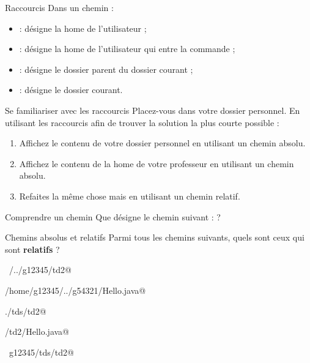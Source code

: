 \documentclass[a4paper,11pt]{style-esi/td}
\begin{document}
		\begin{theorie}{Raccourcis}
			Dans un chemin :
			\begin{itemize}
			\item {} : désigne la home de l'utilisateur  ;
			\item \samp{\textasciitilde{}} : désigne la home de l'utilisateur qui entre la commande ;
			\item {} : désigne le dossier parent du dossier courant ;
			\item {} : désigne le dossier courant.
			\end{itemize}
		\end{theorie}

		\begin{Exercice}{Se familiariser avec les raccourcis}
			Placez-vous dans votre dossier personnel.
			En utilisant les raccourcis 
			afin de trouver la solution la plus courte possible :
			\begin{enumerate}
			\item Affichez le contenu de votre dossier personnel
				en utilisant un chemin absolu.
			\item Affichez le contenu de la home de votre professeur
				en utilisant un chemin absolu.
			\item Refaites la même chose mais en utilisant un chemin relatif.
			\end{enumerate}
		\end{Exercice}

		\begin{Exercice}{Comprendre un chemin}
			Que désigne le chemin suivant :
			 ?
		\end{Exercice}

\newpage

		\begin{Exercice}{Chemins absolus et relatifs}
			Parmi tous les chemins suivants, quels sont ceux qui sont 
			\textbf{relatifs} ?			
			\begin{selectmany} 
			\item \verb@~/../g12345/td2@
			\item \verb@/home/g12345/../g54321/Hello.java@
			\item \verb@./tds/td2@
			\item \verb@tds/td2/Hello.java@
			\item \verb@~g12345/tds/td2@
			\end{selectmany} 
		\end{Exercice}
\end{document}
